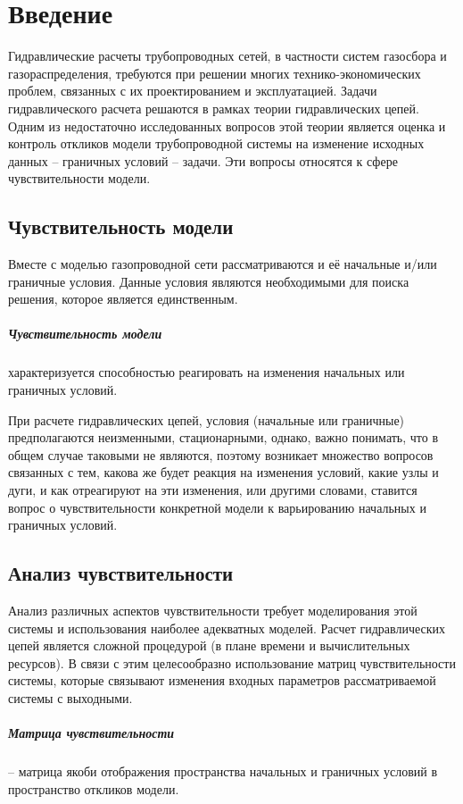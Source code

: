 \chapter{Введение}

Гидравлические расчеты трубопроводных сетей, в частности систем газосбора и газораспределения,
требуются при решении многих технико-экономических проблем, связанных с их проектированием и эксплуатацией. 
Задачи гидравлического расчета решаются в рамках теории гидравлических цепей.
Одним из недостаточно исследованных вопросов этой теории является оценка и контроль откликов модели
трубопроводной системы на изменение исходных данных -- граничных условий -- задачи.
Эти вопросы относятся к сфере чувствительности модели.

\section{Чувствительность модели}
Вместе с моделью газопроводной сети рассматриваются и её начальные и/или граничные условия. Данные условия являются необходимыми для поиска решения, которое является единственным. 

\paragraph{Чувствительность модели} характеризуется способностью реагировать на изменения начальных
или граничных условий.

При расчете гидравлических цепей, условия (начальные или граничные) предполагаются неизменными, стационарными, однако, важно понимать, что в общем случае таковыми не являются, поэтому возникает множество вопросов связанных с тем, какова же будет реакция на изменения условий, какие узлы и дуги, и как отреагируют на эти изменения, или другими словами, ставится вопрос о чувствительности конкретной модели к варьированию начальных и граничных условий. 

\section{Анализ чувствительности}
Анализ различных аспектов чувствительности требует
моделирования этой системы и использования наиболее
адекватных моделей. Расчет гидравлических цепей является
сложной процедурой (в плане времени и вычислительных
ресурсов). В связи с этим целесообразно использование матриц чувствительности системы, которые связывают изменения входных параметров рассматриваемой системы с выходными. 
\paragraph{Матрица чувствительности} --  матрица якоби отображения пространства начальных и граничных условий в пространство откликов модели. 
